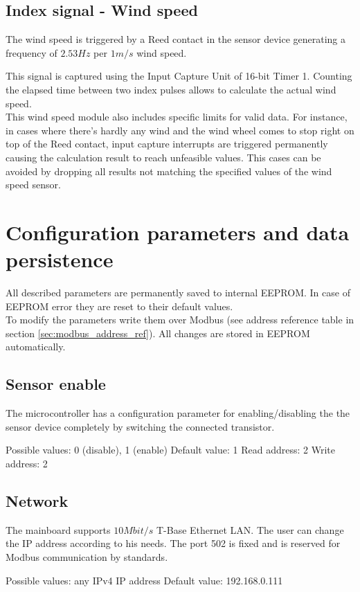 \subsection{Index signal - Wind speed}
The wind speed is triggered by a Reed contact in the sensor device generating a frequency of $2.53 Hz$ per $1 m/s$ wind speed.

This signal is captured using the Input Capture Unit of 16-bit Timer 1. Counting the elapsed time between two index pulses allows to calculate the actual wind speed.\\
This wind speed module also includes specific limits for valid data. For instance, in cases where there's hardly any wind and the wind wheel comes to stop right on top of the Reed contact, input capture interrupts are triggered permanently causing the calculation result to reach unfeasible values. This cases can be avoided by dropping all results not matching the specified values of the wind speed sensor.

\section{Configuration parameters and data persistence}
All described parameters are permanently saved to internal EEPROM. In case of EEPROM error they are reset to their default values.\\
To modify the parameters write them over Modbus (see address reference table in section \ref{sec:modbus_address_ref}). All changes are stored in EEPROM automatically.

\subsection{Sensor enable}
The microcontroller has a configuration parameter for enabling/disabling the the sensor device completely by switching the connected transistor.

Possible values: 0 (disable), 1 (enable)
Default value: 1
Read address: 2
Write address: 2

\subsection{Network}
The mainboard supports $10 Mbit/s$ T-Base Ethernet LAN. The user can change the IP address according to his needs. The port 502 is fixed and is reserved for Modbus communication by standards.

Possible values: any IPv4 IP address
Default value: 192.168.0.111

